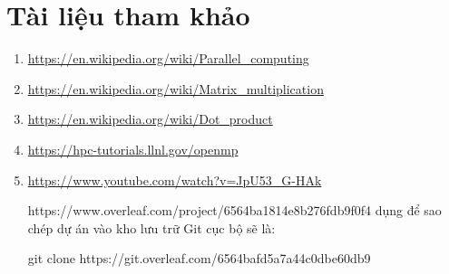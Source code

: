 \newpage
\section*{Tài liệu tham khảo}
 {}

\begin{enumerate}[label=(\arabic*)]
 \item \url{https://en.wikipedia.org/wiki/Parallel_computing}
 \item \url{https://en.wikipedia.org/wiki/Matrix_multiplication}
 \item \url{https://en.wikipedia.org/wiki/Dot_product}
 \item \url{https://hpc-tutorials.llnl.gov/openmp}
 \item \url{https://www.youtube.com/watch?v=JpU53_G-HAk}
 
 https://www.overleaf.com/project/6564ba1814e8b276fdb9f0f4
 dụng để sao chép dự án vào kho lưu trữ Git cục bộ sẽ là:

 git clone https://git.overleaf.com/6564bafd5a7a44c0dbe60db9
\end{enumerate}